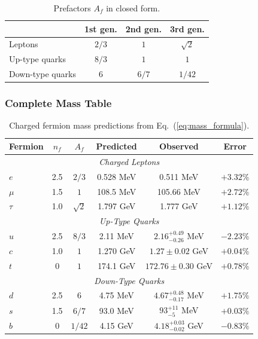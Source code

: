 \begin{table}[h]
\caption{Prefactors $A_f$ in closed form.}
\label{tab:prefactors}
\begin{ruledtabular}
\footnotesize
\begin{tabular}{lccc}
 & 1st gen. & 2nd gen. & 3rd gen. \\
\hline
Leptons & $2/3$ & $1$ & $\sqrt{2}$ \\
Up-type quarks & $8/3$ & $1$ & $1$ \\
Down-type quarks & $6$ & $6/7$ & $1/42$ \\
\end{tabular}
\end{ruledtabular}
\end{table}

\subsubsection{Complete Mass Table}

\begin{table}[h]
\caption{Charged fermion mass predictions from Eq.~(\ref{eq:mass_formula}).}
\label{tab:fermion-full}
\begin{ruledtabular}
\begin{tabular}{lccccc}
Fermion & $n_f$ & $A_f$ & Predicted & Observed & Error \\
\hline
\multicolumn{6}{c}{\textit{Charged Leptons}} \\
$e$ & 2.5 & $2/3$ & 0.528 MeV & 0.511 MeV & $+3.32\%$ \\
$\mu$ & 1.5 & $1$ & 108.5 MeV & 105.66 MeV & $+2.72\%$ \\
$\tau$ & 1.0 & $\sqrt{2}$ & 1.797 GeV & 1.777 GeV & $+1.12\%$ \\[3pt]
\multicolumn{6}{c}{\textit{Up-Type Quarks}} \\
$u$ & 2.5 & $8/3$ & 2.11 MeV & $2.16^{+0.49}_{-0.26}$ MeV & $-2.23\%$ \\
$c$ & 1.0 & $1$ & 1.270 GeV & $1.27 \pm 0.02$ GeV & $+0.04\%$ \\
$t$ & 0 & $1$ & 174.1 GeV & $172.76 \pm 0.30$ GeV & $+0.78\%$ \\[3pt]
\multicolumn{6}{c}{\textit{Down-Type Quarks}} \\
$d$ & 2.5 & $6$ & 4.75 MeV & $4.67^{+0.48}_{-0.17}$ MeV & $+1.75\%$ \\
$s$ & 1.5 & $6/7$ & 93.0 MeV & $93^{+11}_{-5}$ MeV & $+0.03\%$ \\
$b$ & 0 & $1/42$ & 4.15 GeV & $4.18^{+0.03}_{-0.02}$ GeV & $-0.83\%$ \\
\end{tabular}
\end{ruledtabular}
\end{table}

